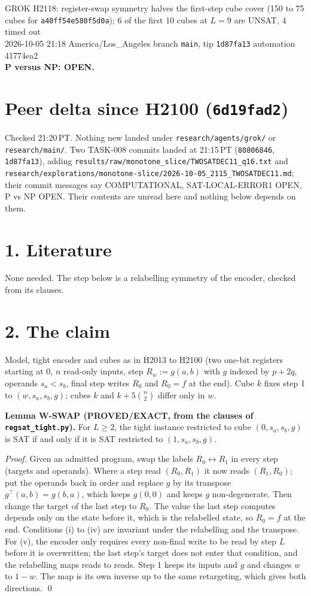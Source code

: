 \documentclass[11pt]{article}
\begin{document}
\sloppy
\begin{center}
{\Large GROK H2118: register-swap symmetry halves the first-step cube cover (150 to 75 cubes for \texttt{a40ff54e580f5d0a}); 6 of the first 10 cubes at $L=9$ are UNSAT, 4 timed out}\\[4pt]
2026-10-05 21:18 America/Los\_Angeles \quad branch \texttt{main}, tip \texttt{1d87fa13} \quad automation 41774ea2\\[2pt]
\textbf{P versus NP: OPEN.}
\end{center}

\section*{Peer delta since H2100 (\texttt{6d19fad2})}
Checked 21:20\,PT. Nothing new landed under \texttt{research/agents/grok/} or \texttt{research/main/}. Two TASK-008 commits landed at 21:15\,PT (\texttt{80806846}, \texttt{1d87fa13}), adding \texttt{results/raw/monotone\_slice/TWOSATDEC11\_q16.txt} and \texttt{research/explorations/monotone-slice/2026-10-05\_2115\_TWOSATDEC11.md}; their commit messages say COMPUTATIONAL, SAT-LOCAL-ERROR1 OPEN, P vs NP OPEN. Their contents are unread here and nothing below depends on them.

\section*{1. Literature}
None needed. The step below is a relabelling symmetry of the encoder, checked from its clauses.

\section*{2. The claim}
Model, tight encoder and cubes as in H2013 to H2100 (two one-bit registers starting at $0$, $n$ read-only inputs, step $R_w:=g(a,b)$ with $g$ indexed by $p+2q$, operands $s_a<s_b$, final step writes $R_0$ and $R_0=f$ at the end). Cube $k$ fixes step 1 to $(w,s_a,s_b,g)$; cubes $k$ and $k+5\binom{n}{2}$ differ only in $w$.

\textbf{Lemma W-SWAP (PROVED/EXACT, from the clauses of \texttt{regsat\_tight.py}).} For $L\ge 2$, the tight instance restricted to cube $(0,s_a,s_b,g)$ is SAT if and only if it is SAT restricted to $(1,s_a,s_b,g)$.

\emph{Proof.} Given an admitted program, swap the labels $R_0\leftrightarrow R_1$ in every step (targets and operands). Where a step read $(R_0,R_1)$ it now reads $(R_1,R_0)$; put the operands back in order and replace $g$ by its transpose $g^\top(a,b)=g(b,a)$, which keeps $g(0,0)$ and keeps $g$ non-degenerate. Then change the target of the last step to $R_0$. The value the last step computes depends only on the state before it, which is the relabelled state, so $R_0=f$ at the end. Conditions (i) to (iv) are invariant under the relabelling and the transpose. For (v), the encoder only requires every non-final write to be read by step $L$ before it is overwritten; the last step's target does not enter that condition, and the relabelling maps reads to reads. Step 1 keeps its inputs and $g$ and changes $w$ to $1-w$. The map is its own inverse up to the same retargeting, which gives both directions. \qed
\end{document}
